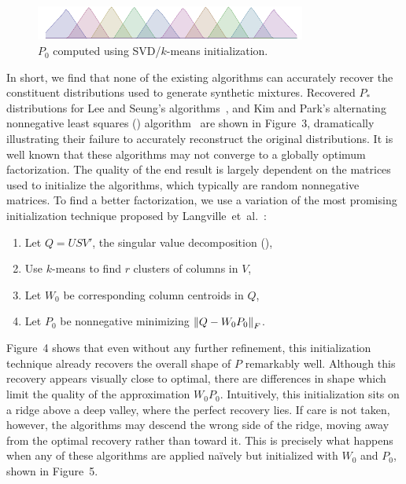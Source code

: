 \documentclass[conference]{IEEEtran}
\begin{document}
\begin{figure}[t]
\begin{center}
\includegraphics[width=3.5in]{synth/Q_ki}
\end{center}
\vspace{-0.7em}
\caption{$P_0$ computed using SVD/$k$-means initialization.}
\vspace{-1em}
\end{figure}

In short, we find that none of the existing  algorithms can accurately recover the constituent distributions used to generate synthetic mixtures.
Recovered $P_*$ distributions for Lee and Seung's algorithms~\cite{Lee01}, and Kim and Park's alternating nonnegative least squares () algorithm~\cite{Kim08} are shown in Figure~3, dramatically illustrating their failure to accurately reconstruct the original distributions.
It is well known that these algorithms may not converge to a globally optimum factorization.
The quality of the end result is largely dependent on the matrices used to initialize the algorithms, which typically are random nonnegative matrices.
To find a better factorization, we use a variation of the most promising initialization technique proposed by Langville~et~al.~\cite{Langville06}:
\begin{enumerate}
  \item Let $Q=USV'$, the singular value decomposition (),
  \item Use $k$-means to find $r$ clusters of columns in $V$,
  \item Let $W_0$ be corresponding column centroids in $Q$,
  \item Let $P_0$ be nonnegative minimizing ${\lVert Q - W_0 P_0\rVert}_F$.
\end{enumerate}
Figure~4 shows that even without any further refinement, this initialization technique already recovers the overall shape of $P$ remarkably well.
Although this recovery appears visually close to optimal, there are differences in shape which limit the quality of the approximation $W_0 P_0$.
Intuitively, this initialization sits on a ridge above a deep valley, where the perfect recovery lies.
If care is not taken, however, the  algorithms may descend the wrong side of the ridge, moving away from the optimal recovery rather than toward it.
This is precisely what happens when any of these algorithms are applied na\"ively but initialized with $W_0$ and $P_0$, shown in Figure~5.
\end{document}
